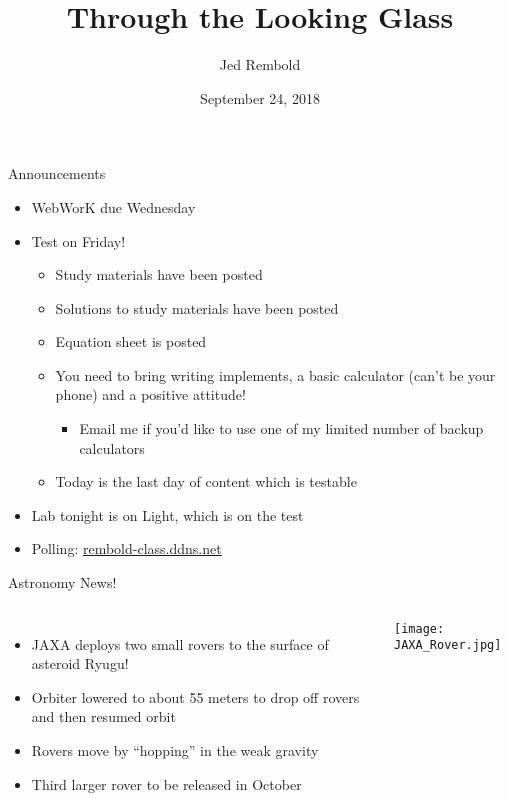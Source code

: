 \documentclass[pdf, aspectratio=169]{beamer}
\title{Through the Looking Glass}
\date{September 24, 2018}
\author{Jed Rembold}
\begin{document}
\renewcommand*{\theenumi}{\Alph{enumi}}

\begin{frame}{Announcements}
  \begin{itemize}
	  \item WebWorK due Wednesday
	  \item Test on Friday!
		  \begin{itemize}
		  	\item Study materials have been posted
			\item Solutions to study materials have been posted
			\item Equation sheet is posted
			\item You need to bring writing implements, a basic calculator (can't be your phone) and a positive attitude!
				\begin{itemize}
					\item Email me if you'd like to use one of my limited number of backup calculators
				\end{itemize}
			\item Today is the last day of content which is testable
		  \end{itemize}
	  \item Lab tonight is on Light, which \alert{is} on the test
	\item Polling: \url{rembold-class.ddns.net}
  \end{itemize}
\end{frame}

\begin{frame}{Astronomy News!}
	\begin{columns}
		\begin{itemize}
			\item JAXA deploys two small rovers to the surface of asteroid Ryugu!
			\item Orbiter lowered to about 55 meters to drop off rovers and then resumed orbit
			\item Rovers move by ``hopping'' in the weak gravity
			\item Third larger rover to be released in October
		\end{itemize}
		
		\begin{center}
			\texttt{[image: JAXA\_Rover.jpg]}
		\end{center}
		
	\end{columns}
\end{frame}
\end{document}
